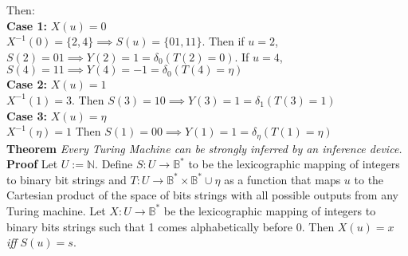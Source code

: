 \documentclass[11pt]{article}
\newcommand{\N}{\mathbb{N}}
\newcommand{\B}{\mathbb{B}}
\begin{document}
%
%
% 
 
 Then: \\
 
 \textbf{Case 1:} $ X(u) = 0 $ \\
 $ X^{-1}(0) = \{2, 4\} \implies S(u) = \{01, 11\} $. Then if $ u = 2 $, $ S(2) = 01 \implies Y(2) = 1 = \delta_0(T(2) = 0) $. If $ u = 4 $, $ S(4) = 11 \implies Y(4) = -1 = \delta_{0}(T(4) = \eta) $ \\
 
 \textbf{Case 2:} $ X(u) = 1 $ \\ 
 $X^{-1}(1) = 3 $. Then $ S(3) = 10 \implies Y(3) = 1 = \delta_{1}(T(3) = 1) $ \\
 
 \textbf{Case 3:} $ X(u) = \eta $ \\
 $X^{-1}(\eta) = 1 $ Then $ S(1) = 00 \implies Y(1) = 1 = \delta_{\eta}(T(1) = \eta) $ \\ 
 
 
\bigbreak
\textbf{Theorem} \quad \textit{Every Turing Machine can be strongly inferred by an inference device.} \\
\textbf{Proof} \quad Let $ U := \N $. Define $ S: U \rightarrow \B^{*} $ to be the lexicographic mapping of integers to binary bit strings and $ T: U \rightarrow \B^{*} \times \B^{*} \cup \eta$ as a function that maps $u$ to the Cartesian product of the space of bits strings with all possible outputs from any Turing machine. Let $ X : U \rightarrow \B^{*} $ be the lexicographic mapping of integers to binary bits strings such that 1 comes alphabetically before 0. Then $ X(u) = x $ \textit{ iff } $S(u) = s $. 
\end{document}
